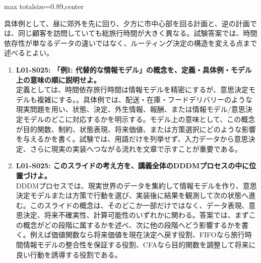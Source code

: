 \begin{minipage}[t]{0.58\textwidth}
\begin{adjustbox}{max totalsize={\textwidth}{0.89\textheight},center}
\begin{minipage}{\textwidth}
具体例として、昼に郊外を先に回り、夕方に市中心部を回る計画と、逆の計画では、同じ顧客を訪問していても総旅行時間が大きく異なる。試験答案では、時間依存性が単なるデータの違いではなく、ルーティング決定の構造を変える点まで述べるとよい。\par{}\begin{enumerate}\item \textbf{L01-S025: 「例I: 代替的な情報モデル」の概念を、定義・具体例・モデル上の意味の順に説明せよ。}\\定義としては、時間依存旅行時間は情報モデルを精密にするが、意思決定モデルも複雑にする。。具体例では、配送・在庫・フードデリバリーのような現実問題を用い、状態、決定、外生情報、報酬、または情報モデル/意思決定モデルのどこに対応するかを明示する。モデル上の意味として、この概念が目的関数、制約、状態表現、将来価値、または方策選択にどのような影響を与えるかを書く。試験では、用語だけを列挙せず、入力データから意思決定、さらに現実の実装へつながる流れを文章で示すことが重要である。\item \textbf{L01-S025: このスライドの考え方を、講義全体のDDDMプロセスの中に位置づけよ。}\\DDDMプロセスでは、現実世界のデータを集約して情報モデルを作り、意思決定モデルまたは方策で行動を選び、実装後に結果を観測して次の状態へ進む。このスライドの概念は、そのどこか一部だけではなく、データ表現、意思決定、将来不確実性、計算可能性のいずれかに関わる。答案では、まずこの概念がどの段階に属するかを述べ、次に他の段階へどう影響するかを書く。例えば価値関数なら将来価値を現在決定へ戻す役割、FIFOなら旅行時間情報モデルの整合性を保証する役割、CFAなら目的関数を調整して将来に良い行動を誘導する役割である。\end{enumerate}
\end{minipage}
\end{adjustbox}
\end{minipage}



